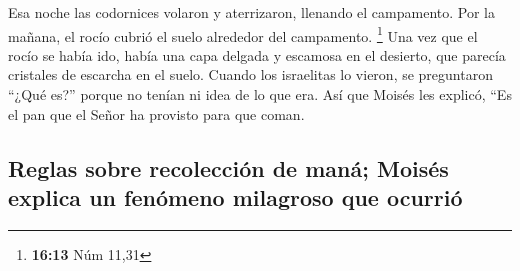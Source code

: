 Esa noche las codornices volaron y aterrizaron, llenando
el campamento. Por la mañana, el rocío cubrió el suelo alrededor del
campamento. \footnote{\textbf{16:13} Núm 11,31}  Una vez
que el rocío se había ido, había una capa delgada y escamosa en el
desierto, que parecía cristales de escarcha en el suelo. 
Cuando los israelitas lo vieron, se preguntaron ``¿Qué es?'' porque no
tenían ni idea de lo que era. Así que Moisés les explicó, ``Es el pan
que el Señor ha provisto para que coman.

\hypertarget{reglas-sobre-recolecciuxf3n-de-manuxe1-moisuxe9s-explica-un-fenuxf3meno-milagroso-que-ocurriuxf3}{%
\subsection{Reglas sobre recolección de maná; Moisés explica un fenómeno
milagroso que
ocurrió}\label{reglas-sobre-recolecciuxf3n-de-manuxe1-moisuxe9s-explica-un-fenuxf3meno-milagroso-que-ocurriuxf3}}

